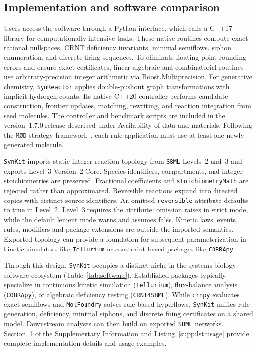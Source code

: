 \documentclass[10pt,a4paper,fleqn]{article}
\newcommand{\synkit}{\texttt{SynKit}\xspace}
\begin{document}
\subsection{Implementation and software comparison}
\label{sec:sbml}
\label{sec:usage}
\label{sec:comparison}

Users access the software through a Python interface, which calls a C++17 library for computationally intensive tasks. These native routines compute exact rational nullspaces, CRNT deficiency invariants, minimal semiflows, siphon enumeration, and discrete firing sequences. To eliminate floating-point rounding errors and ensure exact certificates, linear-algebraic and combinatorial routines use arbitrary-precision integer arithmetic via Boost.Multiprecision. For generative chemistry, \texttt{SynReactor} applies double-pushout graph transformations with implicit hydrogen counts. Its native C++20 controller performs candidate construction, frontier updates, matching, rewriting, and reaction integration from seed molecules. The controller and benchmark scripts are included in the version~1.7.0 release described under Availability of data and materials. Following the \texttt{M\O D} strategy framework~\cite{andersen2014strategies}, each rule application must use at least one newly generated molecule.

\synkit imports static integer reaction topology from \texttt{SBML} Levels~2 and~3 and exports Level~3 Version~2 Core. Species identifiers, compartments, and integer stoichiometries are preserved. Fractional coefficients and \texttt{stoichiometryMath} are rejected rather than approximated. Reversible reactions expand into directed copies with distinct source identifiers. An omitted \texttt{reversible} attribute defaults to true in Level~2. Level~3 requires the attribute: omission raises in strict mode, while the default lenient mode warns and assumes false. Kinetic laws, events, rules, modifiers and package extensions are outside the imported semantics. Exported topology can provide a foundation for subsequent parameterization in kinetic simulators like \texttt{Tellurium} or constraint-based packages like \texttt{COBRApy}.

Through this design, \synkit occupies a distinct niche in the systems biology software ecosystem (Table~\ref{tab:software}). Established packages typically specialize in continuous kinetic simulation (\texttt{Tellurium}), flux-balance analysis (\texttt{COBRApy}), or algebraic deficiency testing (\texttt{CRNT4SBML}). While \texttt{crnpy} evaluates exact semiflows and \texttt{MolFoundry} solves rule-based hyperflows, \synkit unifies rule generation, deficiency, minimal siphons, and discrete firing certificates on a shared model. Downstream analyses can then build on exported \texttt{SBML} networks. Section~1 of the Supplementary Information and Listing~\ref{supp:lst:usage} provide complete implementation details and usage examples.
\end{document}
